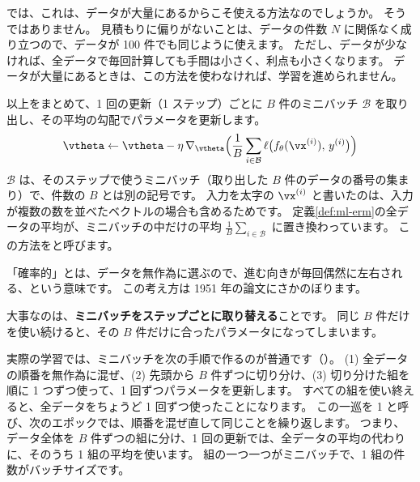 では、これは、データが大量にあるからこそ使える方法なのでしょうか。
そうではありません。
見積もりに偏りがないことは、データの件数 $N$ に関係なく成り立つので、データが 100 件でも同じように使えます。
ただし、データが少なければ、全データで毎回計算しても手間は小さく、利点も小さくなります。
データが大量にあるときは、この方法を使わなければ、学習を進められません。

以上をまとめて、1 回の更新（1 ステップ）ごとに $B$ 件のミニバッチ $\mathcal{B}$ を取り出し、その平均の勾配でパラメータを更新します。
\begin{equation}
\vtheta \leftarrow \vtheta - \eta\,\nabla_{\vtheta}\Bigl(\frac{1}{B}\sum_{i\in\mathcal{B}} \ell\bigl(f_\theta(\vx^{(i)}),\, y^{(i)}\bigr)\Bigr)
\label{eq:ml-sgd}
\end{equation}
$\mathcal{B}$ は、そのステップで使うミニバッチ（取り出した $B$ 件のデータの番号の集まり）で、件数の $B$ とは別の記号です。
入力を太字の $\vx^{(i)}$ と書いたのは、入力が複数の数を並べたベクトルの場合も含めるためです。
定義\ref{def:ml-erm}の全データの平均が、ミニバッチの中だけの平均 $\frac{1}{B}\sum_{i\in\mathcal{B}}$ に置き換わっています。
この方法をと呼びます。

「確率的」とは、データを無作為に選ぶので、進む向きが毎回偶然に左右される、という意味です。
この考え方は 1951 年の論文\cite{robbins1951stochastic}にさかのぼります。

大事なのは、\textbf{ミニバッチをステップごとに取り替える}ことです。
同じ $B$ 件だけを使い続けると、その $B$ 件だけに合ったパラメータになってしまいます。

実際の学習では、ミニバッチを次の手順で作るのが普通です（）。
(1) 全データの順番を無作為に混ぜ、(2) 先頭から $B$ 件ずつに切り分け、(3) 切り分けた組を順に 1 つずつ使って、1 回ずつパラメータを更新します。
すべての組を使い終えると、全データをちょうど 1 回ずつ使ったことになります。
この一巡を 1 と呼び、次のエポックでは、順番を混ぜ直して同じことを繰り返します。
つまり、データ全体を $B$ 件ずつの組に分け、1 回の更新では、全データの平均の代わりに、そのうち 1 組の平均を使います。
組の一つ一つがミニバッチで、1 組の件数がバッチサイズです。

